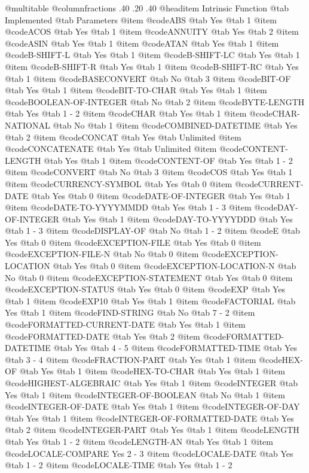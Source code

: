 @multitable @columnfractions .40 .20 .40
@headitem Intrinsic Function @tab Implemented @tab	Parameters
@item @code{ABS} @tab Yes @tab 1
@item @code{ACOS} @tab Yes @tab 1
@item @code{ANNUITY} @tab Yes @tab 2
@item @code{ASIN} @tab Yes @tab 1
@item @code{ATAN} @tab Yes @tab 1
@item @code{B-SHIFT-L} @tab Yes @tab 1
@item @code{B-SHIFT-LC} @tab Yes @tab 1
@item @code{B-SHIFT-R} @tab Yes @tab 1
@item @code{B-SHIFT-RC} @tab Yes @tab 1
@item @code{BASECONVERT} @tab No @tab 3
@item @code{BIT-OF} @tab Yes @tab 1
@item @code{BIT-TO-CHAR} @tab Yes @tab 1
@item @code{BOOLEAN-OF-INTEGER} @tab No @tab 2
@item @code{BYTE-LENGTH} @tab Yes @tab 1 - 2
@item @code{CHAR} @tab Yes @tab 1
@item @code{CHAR-NATIONAL} @tab No @tab 1
@item @code{COMBINED-DATETIME} @tab Yes @tab 2
@item @code{CONCAT} @tab Yes @tab Unlimited
@item @code{CONCATENATE} @tab Yes @tab Unlimited
@item @code{CONTENT-LENGTH} @tab Yes @tab 1
@item @code{CONTENT-OF} @tab Yes @tab 1 - 2
@item @code{CONVERT} @tab No @tab 3
@item @code{COS} @tab Yes @tab 1
@item @code{CURRENCY-SYMBOL} @tab Yes @tab 0
@item @code{CURRENT-DATE} @tab Yes @tab 0
@item @code{DATE-OF-INTEGER} @tab Yes @tab 1
@item @code{DATE-TO-YYYYMMDD} @tab Yes @tab 1 - 3
@item @code{DAY-OF-INTEGER} @tab Yes @tab 1
@item @code{DAY-TO-YYYYDDD} @tab Yes @tab 1 - 3
@item @code{DISPLAY-OF} @tab No @tab 1 - 2
@item @code{E} @tab Yes @tab 0
@item @code{EXCEPTION-FILE} @tab Yes @tab 0
@item @code{EXCEPTION-FILE-N} @tab No @tab 0
@item @code{EXCEPTION-LOCATION} @tab Yes @tab 0
@item @code{EXCEPTION-LOCATION-N} @tab No @tab 0
@item @code{EXCEPTION-STATEMENT} @tab Yes @tab 0
@item @code{EXCEPTION-STATUS} @tab Yes @tab 0
@item @code{EXP} @tab Yes @tab 1
@item @code{EXP10} @tab Yes @tab 1
@item @code{FACTORIAL} @tab Yes @tab 1
@item @code{FIND-STRING} @tab No @tab 7 - 2
@item @code{FORMATTED-CURRENT-DATE} @tab Yes @tab 1
@item @code{FORMATTED-DATE} @tab Yes @tab 2
@item @code{FORMATTED-DATETIME} @tab Yes @tab 4 - 5
@item @code{FORMATTED-TIME} @tab Yes @tab 3 - 4
@item @code{FRACTION-PART} @tab Yes @tab 1
@item @code{HEX-OF} @tab Yes @tab 1
@item @code{HEX-TO-CHAR} @tab Yes @tab 1
@item @code{HIGHEST-ALGEBRAIC} @tab Yes @tab 1
@item @code{INTEGER} @tab Yes @tab 1
@item @code{INTEGER-OF-BOOLEAN} @tab No @tab 1
@item @code{INTEGER-OF-DATE} @tab Yes @tab 1
@item @code{INTEGER-OF-DAY} @tab Yes @tab 1
@item @code{INTEGER-OF-FORMATTED-DATE} @tab Yes @tab 2
@item @code{INTEGER-PART} @tab Yes @tab 1
@item @code{LENGTH} @tab Yes @tab 1 - 2
@item @code{LENGTH-AN} @tab Yes @tab 1
@item @code{LOCALE-COMPARE	Yes	2 - 3}
@item @code{LOCALE-DATE} @tab Yes @tab 1 - 2
@item @code{LOCALE-TIME} @tab Yes @tab 1 - 2
